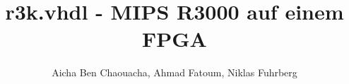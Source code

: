 







\usepackage[utf8]{inputenc}

\usepackage[T1]{fontenc}


\usepackage[ngerman]{babel}




\setcounter{tocdepth}{1}

\title[r3k.vhdl - MIPS R3000 auf dem FPGA]{r3k.vhdl - MIPS R3000 auf einem FPGA}
\author{Aicha Ben Chaouacha, Ahmad Fatoum, Niklas Fuhrberg}
